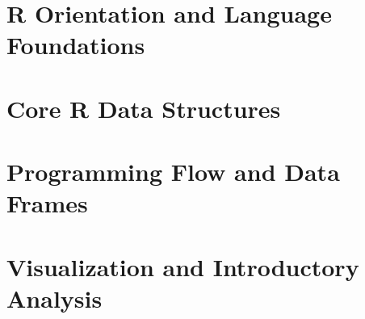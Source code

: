 \documentclass[11pt,oneside,a4paper]{report}
\begin{document}


\cleardoublepage
{}

\part{R Orientation and Language Foundations}





\part{Core R Data Structures}





\part{Programming Flow and Data Frames}







\part{Visualization and Introductory Analysis}






\end{document}
